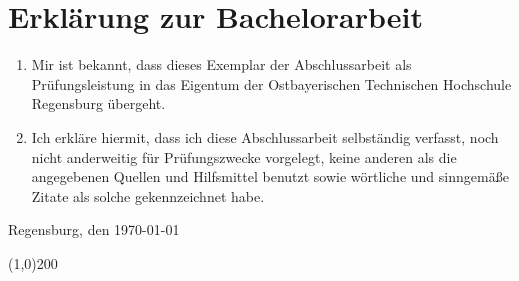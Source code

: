\thispagestyle{empty}
\section*{Erklärung zur Bachelorarbeit}

\bigskip
\bigskip 
\bigskip 

\begin{enumerate}
    \item Mir ist bekannt, dass dieses Exemplar der Abschlussarbeit als Prüfungsleistung in das Eigentum der Ostbayerischen Technischen Hochschule Regensburg übergeht.
    \item Ich erkläre hiermit, dass ich diese Abschlussarbeit selbständig verfasst, noch nicht anderweitig für Prüfungszwecke vorgelegt, keine anderen als die angegebenen Quellen und Hilfsmittel benutzt sowie wörtliche und sinngemäße Zitate als solche gekennzeichnet habe.
\end{enumerate}

\bigskip 
\bigskip 
\bigskip 

Regensburg, den \today

\bigskip 
\bigskip

\line(1,0){200}
\newline
\studierenderName